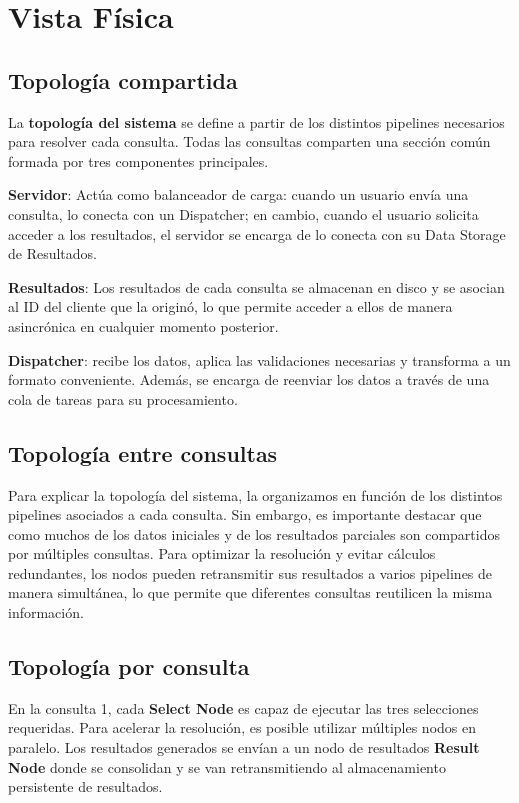 \clearpage

\section{Vista Física}

\subsection{Topología compartida}

La \textbf{topología del sistema} se define a partir de los distintos pipelines necesarios para resolver cada consulta. Todas las consultas comparten una sección común formada por tres componentes principales.

\textbf{Servidor}: Actúa como balanceador de carga: cuando un usuario envía una consulta, lo conecta con un Dispatcher; en cambio, cuando el usuario solicita acceder a los resultados, el servidor se encarga de lo conecta con su Data Storage de Resultados.

\textbf{Resultados}: Los resultados de cada consulta se almacenan en disco y se asocian al ID del cliente que la originó, lo que permite acceder a ellos de manera asincrónica en cualquier momento posterior.

\textbf{Dispatcher}: recibe los datos, aplica las validaciones necesarias y transforma a un formato conveniente. Además, se encarga de reenviar los datos a través de una cola de tareas para su procesamiento.

\subsection{Topología entre consultas}

Para explicar la topología del sistema, la organizamos en función de los distintos pipelines asociados a cada consulta. Sin embargo, es importante destacar que como muchos de los datos iniciales y de los resultados parciales son compartidos por múltiples consultas. Para optimizar la resolución y evitar cálculos redundantes, los nodos pueden retransmitir sus resultados a varios pipelines de manera simultánea, lo que permite que diferentes consultas reutilicen la misma información.

\subsection{Topología por consulta}

En la consulta 1, cada \textbf{Select Node} es capaz de ejecutar las tres selecciones requeridas. Para acelerar la resolución, es posible utilizar múltiples nodos en paralelo. Los resultados generados se envían a un nodo de resultados \textbf{Result Node} donde se consolidan y se van retransmitiendo al almacenamiento persistente de resultados.

